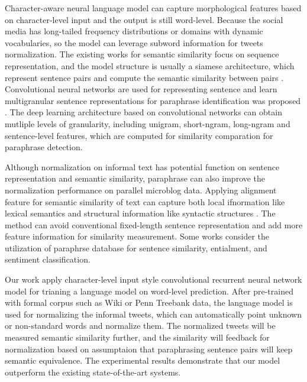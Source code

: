 \documentclass[letterpaper]{article}
\begin{document}
Character-aware neural language model \cite{Kim-AAAI1612489} can capture morphological features based on character-level input and the output is still word-level. Because the social media has long-tailed frequency distributions or domains with dynamic vocabularies, so the model can leverage subword information for tweets normalization. The existing works for semantic similarity focus on sequence representation, and the model structure is usually a siamese architecture, which represent sentence pairs and compute the semantic similarity between pairs \cite{jonas-aditya:2016:AAAI}. Convolutional neural networks are used for representing sentence and learn multigranular sentence representations for paraphrase identification was proposed \cite{yin-schutze:2015:NAACL}. The deep learning architecture based on convolutional networks can obtain mutliple levels of granularity, including unigram, short-ngram, long-ngram and sentence-level features, which are computed for similarity comparation for paraphrase detection.

Although normalization on informal text has potential function on sentence representation and semantic similarity, paraphrase can also improve the normalization performance \cite{ling-EtAl:2013:EMNLP} on parallel microblog data. Applying alignment feature for semantic similarity of text can capture both local ifnormation like lexical semantics and structural information like syntactic structures \cite{chen-praveen:2016:ijcai}. The method can avoid conventional fixed-length sentence representation and add more feature information for similarity measurement. Some works \cite{DBLP:journals/corr/WietingBGL15a,pavlick-EtAl:2015:ACL-IJCNLP} consider the utilization of paraphrse database \cite{ganitkevitch-vandurme-callisonburch:2013:NAACL-HLT,pavlick-EtAl:2015:ACL-IJCNLP3}for sentence similarity, entialment, and sentiment classification.

Our work apply character-level input style convolutional recurrent neural network model for trianing a language model on word-level prediction. After pre-trained with formal corpus such as Wiki or Penn Treebank data, the language model is used for normalizing the informal tweets, which can automatically point unknown or non-standard words and normalize them. The normalized tweets will be measured semantic similarity further, and the similarity will feedback for normalization based on assumptaion that paraphrasing sentence pairs will keep semantic equivalence. The experimental results demonstrate that our model outperform the existing state-of-the-art systems.
\end{document}
